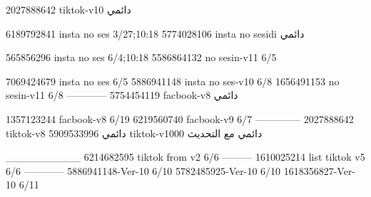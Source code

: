 2027888642 tiktok-v10
دائمي

6189792841 insta no ses
3/27;10:18
5774028106 insta no sesidi
دائمي

565856296 insta no ses
6/4;10:18
5586864132 no sesin-v11
6/5

7069424679 insta no ses
6/5
5886941148 insta no ses-v10
6/8
1656491153 no sesin-v11
6/8
------------
5754454119 facbook-v8
دائمي

1357123244 facbook-v8
6/19
6219560740 facbook-v9
6/7
--------------
2027888642 tiktok-v8
دائمي
5909533996 tiktok-v1000
دائمي مع التحديث

__________
6214682595 tiktok from v2
6/6
---------
1610025214 list tiktok v5
6/6
------------
5886941148-Ver-10
6/10
5782485925-Ver-10
6/10
1618356827-Ver-10
6/11
